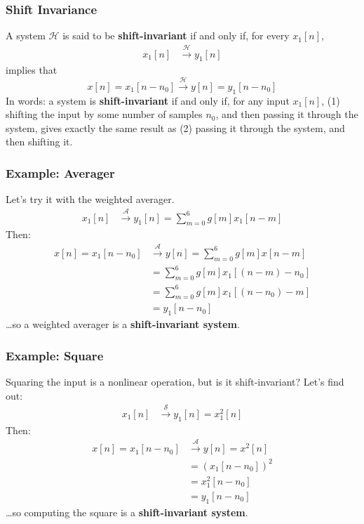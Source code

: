\documentclass{beamer}
\begin{document}
\begin{frame}
  \frametitle{Shift Invariance}

  A system ${\mathcal H}$ is said to be {\bf shift-invariant} if and
  only if, for every $x_1[n]$,
  \begin{align*}
    x_1[n] &\stackrel{\mathcal H}{\longrightarrow} y_1[n]
  \end{align*}
  implies that
  \[
  x[n]=x_1[n-n_0] \stackrel{\mathcal H}{\longrightarrow} y[n]=y_1[n-n_0]
  \]
  In words: a system is {\bf shift-invariant} if and only if, for any
  input $x_1[n]$, (1) shifting the input by some number of samples
  $n_0$, and then passing it through the system, gives exactly the
  same result as (2) passing it through the system, and then shifting
  it.
\end{frame}

\begin{frame}
  \frametitle{Example: Averager}

  Let's try it with the weighted averager.
  \begin{align*}
  x_1[n] &\stackrel{\mathcal A}{\longrightarrow} y_1[n]=\sum_{m=0}^6 g[m] x_1[n-m]
  \end{align*}
  Then:
  \begin{align*}
    x[n]=x_1[n-n_0] &\stackrel{\mathcal A}{\longrightarrow} y[n]=\sum_{m=0}^6 g[m] x[n-m]\\
    &=\sum_{m=0}^6 g[m] x_1\left[(n-m)-n_0\right]\\
    &=\sum_{m=0}^6 g[m] x_1\left[(n-n_0)-m\right]\\
    &=y_1[n-n_0]
  \end{align*}
  \ldots so a weighted averager is a {\bf shift-invariant system}.
\end{frame}

\begin{frame}
  \frametitle{Example: Square}

  Squaring the input is a nonlinear operation, but is it shift-invariant?
  Let's find out:
  \begin{align*}
  x_1[n] &\stackrel{\mathcal S}{\longrightarrow} y_1[n]=x_1^2[n]
  \end{align*}
  Then:
  \begin{align*}
    x[n]=x_1[n-n_0] &\stackrel{\mathcal A}{\longrightarrow} y[n]=x^2[n]\\
    &= \left(x_1[n-n_0]\right)^2\\
    &= x_1^2[n-n_0]\\
    &=y_1[n-n_0]
  \end{align*}
  \ldots so computing the square is a {\bf shift-invariant system}.
\end{frame}
\end{document}
